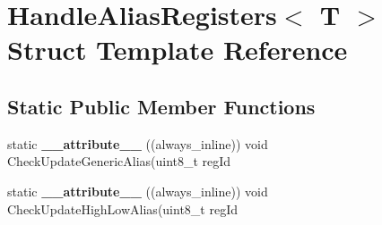 \hypertarget{structHandleAliasRegisters}{\section{Handle\-Alias\-Registers$<$ T $>$ Struct Template Reference}
\label{structHandleAliasRegisters}
}
\subsection*{Static Public Member Functions}
\begin{DoxyCompactItemize}
\item 
\hypertarget{structHandleAliasRegisters_ae86d39d8050b0f85b284cbe567b99d77}{static {\bfseries \-\_\-\-\_\-attribute\-\_\-\-\_\-} ((always\-\_\-inline)) void Check\-Update\-Generic\-Alias(uint8\-\_\-t reg\-Id}\label{structHandleAliasRegisters_ae86d39d8050b0f85b284cbe567b99d77}

\item 
\hypertarget{structHandleAliasRegisters_a2ad30fdc6bbc6f8541be81711233e63f}{static {\bfseries \-\_\-\-\_\-attribute\-\_\-\-\_\-} ((always\-\_\-inline)) void Check\-Update\-High\-Low\-Alias(uint8\-\_\-t reg\-Id}\label{structHandleAliasRegisters_a2ad30fdc6bbc6f8541be81711233e63f}

\end{DoxyCompactItemize}
